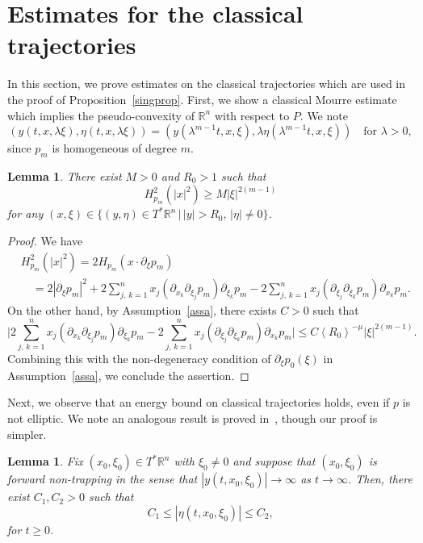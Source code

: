 \documentclass[10pt]{amsart}
\newtheorem{lemm}[cdrthm]{Lemma}
\theoremstyle{definition}
\renewcommand*\l{\lambda}
\newcommand*\m{\mu}
\newcommand*\x{\xi}
\newcommand*\y{\eta}
\newcommand*\re{\mathbb{R}}
\newcommand*\pa{\partial}
\newcommand{\jap}[1]{\left\langle #1 \right\rangle}
\newcommand{\biggabs}[1]{\biggl| #1 \biggr|}
\begin{document}
\appendix
\section{Estimates for the classical trajectories}\label{appa}
In this section, we prove estimates on the classical trajectories which are used in the proof of Proposition~\ref{singprop}. First, we show a classical Mourre estimate which implies the pseudo-convexity of $\re^n$ with respect to $P$. We note
\[
\left(y(t,x,\l\x),\y(t,x,\l\x)\right)=\left(y\left(\l^{m-1}t,x,\x\right),\l\y\left(\l^{m-1}t,x,\x\right)\right)\quad \text{for }\l>0,
\]
since $p_m$ is homogeneous of degree $m$.
\begin{lemm}\label{mourre}
There exist $M>0$ and $R_0>1$ such that
\[
H_{p_m}^2(|x|^2)\geq M|\x|^{2(m-1)}
\]
for any $(x,\x)\in \{(y,\y)\in T^*\re^{n}\,|\, |y|>R_0,\,|\y|\neq 0\}$.

\end{lemm}

\begin{proof}
We have
\begin{align*}
&H_{p_m}^2(|x|^2)=2H_{p_m}\left(x\cdot \pa_{\x}p_m\right)\\
&\quad =2|\pa_{\x}p_m|^2+2\sum_{j,\,k=1}^{n}x_j\left(\pa_{x_k}\pa_{\x_j}p_m\right)\pa_{\x_k}p_m- 2\sum_{j,\,k=1}^nx_j\left(\pa_{\x_j}\pa_{\x_k}p_m\right)\pa_{x_k}p_m.
\end{align*}
On the other hand, by Assumption~\ref{assa}, there exists $C>0$ such that
\[
\biggabs{2\sum_{j,\,k=1}^{n}x_j\left(\pa_{x_k}\pa_{\x_j}p_m\right)\pa_{\x_k}p_m- 2\sum_{j,\,k=1}^nx_j\left(\pa_{\x_j}\pa_{\x_k}p_m\right)\pa_{x_k}p_m}
\leq C\jap{R_0}^{-\m}|\x|^{2(m-1)}.
\]
Combining this with the non-degeneracy condition of $\pa_\x p_0(\x)$ in Assumption~\ref{assa}, we conclude the assertion.
\end{proof}


Next, we observe that an energy bound on classical trajectories holds, even if $p$ is not elliptic. We note an analogous result is proved in~\cite{KPRV}, though our proof is simpler.

\begin{lemm}\label{energy}
Fix $(x_0,\x_0)\in T^{*}\re^n$ with $\x_0\neq 0$ and suppose that $(x_0,\x_0)$ is forward non-trapping in the sense that $|y(t,x_0,\x_0)|\to \infty$ as $t\to \infty$. Then, there exist $C_1, C_2>0$ such that
\[
C_1\leq |\y(t, x_0, \x_0)|\leq C_2,
\]
for $t\geq 0$.
\end{lemm}
\end{document}
